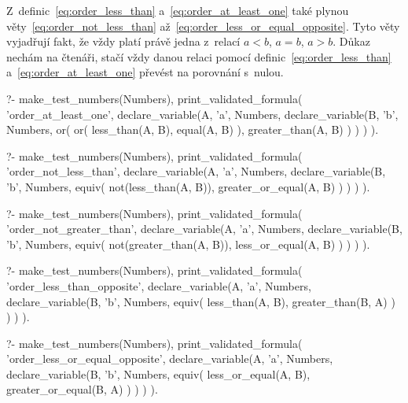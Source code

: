 Z~definic~\eqref{eq:order_less_than} a~\eqref{eq:order_at_least_one} také plynou věty~\eqref{eq:order_not_less_than} až~\eqref{eq:order_less_or_equal_opposite}. Tyto věty vyjadřují fakt, že vždy platí právě jedna z~relací \(a < b\), \(a = b\), \(a > b\). Důkaz nechám na čtenáři, stačí vždy danou relaci pomocí definic~\eqref{eq:order_less_than} a~\eqref{eq:order_at_least_one} převést na porovnání s~nulou.

\begin{fact}
\begin{prolog}
?-	make_test_numbers(Numbers),
	print_validated_formula(
		'order_at_least_one',
		declare_variable(A, 'a', Numbers,
			declare_variable(B, 'b', Numbers,
				or(
					or(
						less_than(A, B),
						equal(A, B)
					),
					greater_than(A, B)
				)
			)
		)
	).
\end{prolog}
\begin{prolog}
?-	make_test_numbers(Numbers),
	print_validated_formula(
		'order_not_less_than',
		declare_variable(A, 'a', Numbers,
			declare_variable(B, 'b', Numbers,
				equiv(
					not(less_than(A, B)),
					greater_or_equal(A, B)
				)
			)
		)
	).
\end{prolog}
\begin{prolog}
?-	make_test_numbers(Numbers),
	print_validated_formula(
		'order_not_greater_than',
		declare_variable(A, 'a', Numbers,
			declare_variable(B, 'b', Numbers,
				equiv(
					not(greater_than(A, B)),
					less_or_equal(A, B)
				)
			)
		)
	).
\end{prolog}
\begin{prolog}
?-	make_test_numbers(Numbers),
	print_validated_formula(
		'order_less_than_opposite',
		declare_variable(A, 'a', Numbers,
			declare_variable(B, 'b', Numbers,
				equiv(
					less_than(A, B),
					greater_than(B, A)
				)
			)
		)
	).
\end{prolog}
\begin{prolog}
?-	make_test_numbers(Numbers),
	print_validated_formula(
		'order_less_or_equal_opposite',
		declare_variable(A, 'a', Numbers,
			declare_variable(B, 'b', Numbers,
				equiv(
					less_or_equal(A, B),
					greater_or_equal(B, A)
				)
			)
		)
	).
\end{prolog}
\end{fact}

